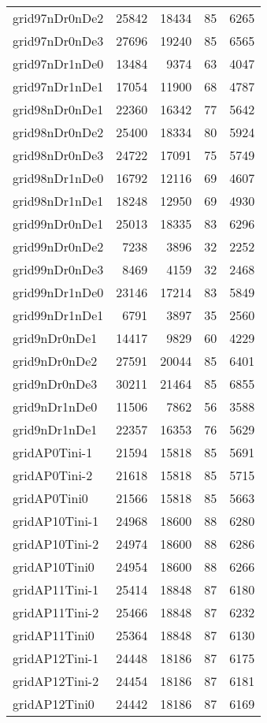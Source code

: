 \begin{longtable}{lrrrr}
grid97nDr0nDe2 & 25842 & 18434 & 85 & 6265 \\
grid97nDr0nDe3 & 27696 & 19240 & 85 & 6565 \\
grid97nDr1nDe0 & 13484 & 9374 & 63 & 4047 \\
grid97nDr1nDe1 & 17054 & 11900 & 68 & 4787 \\
grid98nDr0nDe1 & 22360 & 16342 & 77 & 5642 \\
grid98nDr0nDe2 & 25400 & 18334 & 80 & 5924 \\
grid98nDr0nDe3 & 24722 & 17091 & 75 & 5749 \\
grid98nDr1nDe0 & 16792 & 12116 & 69 & 4607 \\
grid98nDr1nDe1 & 18248 & 12950 & 69 & 4930 \\
grid99nDr0nDe1 & 25013 & 18335 & 83 & 6296 \\
grid99nDr0nDe2 & 7238 & 3896 & 32 & 2252 \\
grid99nDr0nDe3 & 8469 & 4159 & 32 & 2468 \\
grid99nDr1nDe0 & 23146 & 17214 & 83 & 5849 \\
grid99nDr1nDe1 & 6791 & 3897 & 35 & 2560 \\
grid9nDr0nDe1 & 14417 & 9829 & 60 & 4229 \\
grid9nDr0nDe2 & 27591 & 20044 & 85 & 6401 \\
grid9nDr0nDe3 & 30211 & 21464 & 85 & 6855 \\
grid9nDr1nDe0 & 11506 & 7862 & 56 & 3588 \\
grid9nDr1nDe1 & 22357 & 16353 & 76 & 5629 \\
gridAP0Tini-1 & 21594 & 15818 & 85 & 5691 \\
gridAP0Tini-2 & 21618 & 15818 & 85 & 5715 \\
gridAP0Tini0 & 21566 & 15818 & 85 & 5663 \\
gridAP10Tini-1 & 24968 & 18600 & 88 & 6280 \\
gridAP10Tini-2 & 24974 & 18600 & 88 & 6286 \\
gridAP10Tini0 & 24954 & 18600 & 88 & 6266 \\
gridAP11Tini-1 & 25414 & 18848 & 87 & 6180 \\
gridAP11Tini-2 & 25466 & 18848 & 87 & 6232 \\
gridAP11Tini0 & 25364 & 18848 & 87 & 6130 \\
gridAP12Tini-1 & 24448 & 18186 & 87 & 6175 \\
gridAP12Tini-2 & 24454 & 18186 & 87 & 6181 \\
gridAP12Tini0 & 24442 & 18186 & 87 & 6169 \\

\end{longtable}
